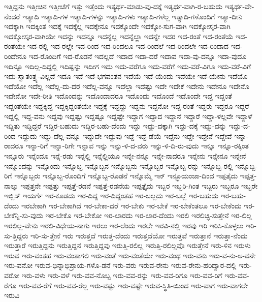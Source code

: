 {ಇತ್ತಿದ್ದನು
ಇತ್ತೀಚಿನ
ಇತ್ತೀಚೆಗೆ
ಇತ್ತು
ಇತ್ತೆಂದು
ಇತ್ಯರ್ಥ-ಮಾಡು-ವು-ದಕ್ಕೆ
ಇತ್ಯರ್ಥ-ವಾಗಿ-ರ-ಬಹುದು
ಇತ್ಯರ್ಥ-ವೇ-ನೆಂದರೆ
ಇತ್ಯಾದಿ
ಇತ್ಯಾದಿ-ಗಳ
ಇತ್ಯಾದಿ-ಗಳನ್ನು
ಇತ್ಯಾದಿ-ಗಳು
ಇತ್ಯಾದಿ-ಗಳೆಲ್ಲ
ಇತ್ಯಾದಿ-ಗಳೊಂದಿಗೆ
ಇತ್ಯಾ-ದೀನಿ
ಇದಕ್ಕಾಗಿ
ಇದಕ್ಕಿಂತ
ಇದಕ್ಕೆ
ಇದಕ್ಕೆಲ್ಲ
ಇದಕ್ಕೇನೂ
ಇದಕ್ಕೊಂದೇ
ಇದಕ್ಕೋ-ಸುಗ-ವಾಗಿ
ಇದಕ್ಕೋಸ್ಕರ-ವಾಗಿ
ಇದಕ್ಕೋಸ್ಕರ-ವಾಗಿಯೇ
ಇದನ್ನು
ಇದನ್ನೂ
ಇದನ್ನೆಲ್ಲ
ಇದನ್ನೆಲ್ಲಾ
ಇದನ್ನೇ
ಇದರ
ಇದ-ರಂತೆ
ಇದ-ರಂತೆಯೆ
ಇದ-ರಂತೆಯೇ
ಇದ-ರಲ್ಲಿ
ಇದ-ರಲ್ಲೇ
ಇದ-ರಿಂದ
ಇದ-ರಿಂದಲೂ
ಇದ-ರಿಂದಲೆ
ಇದ-ರಿಂದಲೇ
ಇದ-ರಿಂದಾದ
ಇದ-ರಿಂದೇನೂ
ಇದ-ರೊಂದಿಗೆ
ಇದ-ರೊಡನೆ
ಇದಲ್ಲದೆ
ಇದಾದ
ಇದಾ-ದರೆ
ಇದಾವ
ಇದಾ-ವು-ದನ್ನೂ
ಇದಾ-ವುದೂ
ಇದಿನ್ನೂ
ಇದಿಲ್ಲ-ದಿದ್ದಲ್ಲಿ
ಇದಿಷ್ಟನ್ನು
ಇದೀಗ
ಇದು
ಇದು-ವರೆಗೂ
ಇದು-ವರೆಗೆ
ಇದು-ವರೆ-ವಿಗೂ
ಇದು-ವರೆ-ವಿಗೆ
ಇದು-ಸ್ವಾತಂತ್ರ್ಯ-ವಿಲ್ಲದೆ
ಇದೂ
ಇದೆ
ಇದೆ-ಭಗವಂತನ
ಇದೆಯೆ
ಇದೆ-ಯೆಂದು
ಇದೆಯೇ
ಇದೆ-ಯೇನು
ಇದೆಯೊ
ಇದೆಯೋ
ಇದೆಲ್ಲ
ಇದೆಲ್ಲ-ದು-ದರ
ಇದೆಲ್ಲ-ವನ್ನೂ
ಇದೆಲ್ಲಾ
ಇದೆಷ್ಟು
ಇದೇ
ಇದೇಕೆ
ಇದೇನು
ಇದೇನೂ
ಇದೇನೊ
ಇದೇನೋ
ಇದೇ-ರೀತಿ
ಇದೊಂದನ್ನು
ಇದೊಂದಾದರೂ
ಇದೊಂದು
ಇದೊಂದೆ
ಇದೊಂದೇ
ಇದ್ದ
ಇದ್ದಂತೆ
ಇದ್ದಂತೆಯೇ
ಇದ್ದಕ್ಕಿದ್ದ
ಇದ್ದಕ್ಕಿದ್ದಂತೆಯೇ
ಇದ್ದಕ್ಕೆ
ಇದ್ದದ್ದು
ಇದ್ದನು
ಇದ್ದನೋ
ಇದ್ದ-ರಂತೆ
ಇದ್ದರು
ಇದ್ದರೂ
ಇದ್ದರೆ
ಇದ್ದಲ್ಲಿ
ಇದ್ದ-ವನು
ಇದ್ದವು
ಇದ್ದಷ್ಟು
ಇದ್ದಷ್ಟೂ
ಇದ್ದಷ್ಟೇ
ಇದ್ದಾಗ
ಇದ್ದಾದ
ಇದ್ದಾನೆ
ಇದ್ದಾರೆ
ಇದ್ದಾ-ಳಲ್ಲವೇ
ಇದ್ದಾಳೆ
ಇದ್ದಿತು
ಇದ್ದಿದ್ದರೆ
ಇದ್ದಿರ-ಬಹುದು
ಇದ್ದಿರ-ಬಹು-ದೆಂದು
ಇದ್ದು
ಇದ್ದು-ದಕ್ಕಾಗಿ
ಇದ್ದು-ದಕ್ಕೆ
ಇದ್ದು-ದನ್ನು
ಇದ್ದು-ದ-ರಿಂದ
ಇದ್ದುದು
ಇದ್ದು-ದೆಲ್ಲ-ವನ್ನೂ
ಇದ್ದುದೇ
ಇದ್ದುವು
ಇದ್ದೆ
ಇದ್ದೆ-ಡೆಯೆ
ಇದ್ದೆನು
ಇದ್ದೇ
ಇದ್ದೇನೆ
ಇದ್ದೇವೆ
ಇನ್ನಾ-ರಾದರೂ
ಇನ್ನಾ-ರಿಗೆ
ಇನ್ನಾ-ರಿಗೇ
ಇನ್ನಾವ
ಇನ್ನು
ಇನ್ನು-ಳಿ-ದ-ವರು
ಇನ್ನು-ಳಿ-ದಿ-ರು-ವುದು
ಇನ್ನೂ
ಇನ್ನೂ-ರಕ್ಕಿಂತ
ಇನ್ನೂರು
ಇನ್ನೆಂದೂ
ಇನ್ನೆ-ರಡು
ಇನ್ನೆಲ್ಲಿ
ಇನ್ನೆಲ್ಲಿಯೂ
ಇನ್ನೇ-ನನ್ನೂ
ಇನ್ನೇ-ನಾದರೂ
ಇನ್ನೇನು
ಇನ್ನೇನೂ
ಇನ್ನೇನೆ
ಇನ್ನೊಂದನ್ನು
ಇನ್ನೊಂದು
ಇನ್ನೊಬ್ಬ
ಇನ್ನೊಬ್ಬನ
ಇನ್ನೊಬ್ಬನು
ಇನ್ನೊಬ್ಬರ
ಇನ್ನೊಬ್ಬ-ರನ್ನು
ಇನ್ನೊಬ್ಬ-ರಲ್ಲಿ
ಇನ್ನೊಬ್ಬ-ರಿಗೆ
ಇನ್ನೊಬ್ಬರು
ಇನ್ನೊಬ್ಬ-ರೊಂದಿಗೆ
ಇನ್ನೊಬ್ಬ-ರೊಡನೆ
ಇನ್ನೊಮ್ಮೆ
ಇನ್
ಇನ್ಫ್ಲೂಯಂಜಾ-ದಿಂದ
ಇಪ್ಪತೈದು
ಇಪ್ಪತ್ತ-ನಾಲ್ಕು
ಇಪ್ಪತ್ತನೇ
ಇಪ್ಪತ್ತು
ಇಪ್ಪತ್ತೆ-ರಡನೆ
ಇಪ್ಪತ್ತೆ-ರಡನೆಯ
ಇಪ್ಪತ್ತೈದು
ಇಬ್ಬರ
ಇಬ್ಬರಿ-ಗಿಂತ
ಇಬ್ಬರು
ಇಬ್ಬರೂ
ಇಬ್ಬರೇ
ಇಬ್ಲಿಸ್
ಇಯರ್ಗೆ
ಇರ-ಕೂಡದು
ಇರ-ದಿದ್ದ
ಇರ-ದಿದ್ದಂತಹ
ಇರ-ಬಲ್ಲದು
ಇರ-ಬಲ್ಲೆ
ಇರ-ಬಹುದು
ಇರ-ಬಹು-ದೆಂದು
ಇರಬೇಕಾಗಿ
ಇರ-ಬೇಕಾಗಿದೆ
ಇರ-ಬೇಕಾ-ದರೆ
ಇರ-ಬೇಕು
ಇರ-ಬೇಕೆ
ಇರ-ಬೇಕೆಂತಲೂ
ಇರ-ಬೇಕೆಂದು
ಇರ-ಬೇಕೆನ್ನಿ-ಸು-ವುದು
ಇರ-ಬೇಕೊ
ಇರ-ಬೇಕೋ
ಇರ-ಲಾರದು
ಇರ-ಲಾರ-ದೆಂದು
ಇರಲಿ
ಇರಲಿಚ್ಛಿ-ಸುತ್ತೇನೆ
ಇರ-ಲಿಲ್ಲ
ಇರಲಿಲ್ಲ-ವೇನು
ಇರಲಿ-ವಿಧೇಯ-ನಾಗು
ಇರಲು
ಇರ-ಲೆಂದು
ಇರಲೇ
ಇರವಿ-ನಲ್ಲಿ
ಇರವು
ಇರಿ
ಇರಿಸಿ-ಕೊಳ್ಳಲು
ಇರಿ-ಸು-ತ್ತಿದ್ದರು
ಇರಿ-ಸು-ತ್ತೇನೆ
ಇರು
ಇರುತ್ತದೆ
ಇರುತ್ತ-ದೆಂದು
ಇರುತ್ತದೆಯೋ
ಇರುತ್ತವೆ
ಇರುತ್ತಾನೆ
ಇರುತ್ತಾ-ನೆಂದು
ಇರುತ್ತಾರೆ
ಇರುತ್ತಿದ್ದನು
ಇರುತ್ತಿದ್ದನೆ
ಇರುತ್ತಿದ್ದವು
ಇರುತ್ತಿ-ರಲಿಲ್ಲ
ಇರುತ್ತಿ-ರಲಿಲ್ಲವೊ
ಇರುತ್ತೇನೆ
ಇರು-ಳಿನ
ಇರುಳು
ಇರುವ
ಇರು-ವಂತಹ
ಇರು-ವಂತಾಗಲಿ
ಇರು-ವಂತೆ
ಇರು-ವಂತೆಯೇ
ಇರು-ವಂಥ
ಇರು-ವನು
ಇರು-ವ-ನು-ಅ-ವನೇ
ಇರು-ವನೋ
ಇರುವ-ಭಿನ್ನಾಭಿಪ್ರಾಯ-ಗಳೊ-ಡನೆ
ಇರು-ವರು
ಇರುವ-ರೇನು
ಇರುವ-ರೇನು-ಹರಿದ್ವಾರ-ದಲ್ಲಿ
ಇರು-ವರೋ
ಇರು-ವಳು
ಇರು-ವಳೆ
ಇರು-ವವ-ನೊಬ್ಬ
ಇರು-ವವ-ರನ್ನು
ಇರು-ವವ-ರಿಗೂ
ಇರು-ವವ-ರಿಗೆ
ಇರು-ವವ-ರೆಗೂ
ಇರು-ವವ-ರೆಗೆ
ಇರು-ವವ-ರೆಲ್ಲ
ಇರು-ವಷ್ಟು
ಇರು-ವಷ್ಟೇ
ಇರುವ-ಸ್ಥಿತಿ-ಯಿಂದ
ಇರು-ವಾಗ
ಇರು-ವಾಗಲೇ
ಇರುವಿ
}
